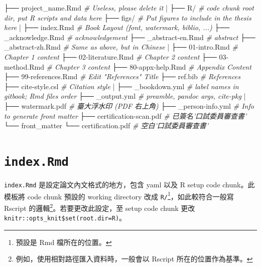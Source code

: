\documentclass[oneside]{book}
\newenvironment{Shaded}{\begin{snugshade}}{\end{snugshade}}
\newcommand{\CommentTok}[1]{\textcolor[rgb]{0.56,0.35,0.01}{\textit{#1}}}
\newcommand{\NormalTok}[1]{#1}
\theoremstyle{definition}
\theoremstyle{definition}
\theoremstyle{definition}
\theoremstyle{remark}
\begin{document}
\begin{Shaded}
\begin{Highlighting}[]
\NormalTok{├── project_name.Rmd     }\CommentTok{# Useless, please delete it}
\NormalTok{|}
\NormalTok{├── R/                   }\CommentTok{# code chunk root dir, put R scripts and data here}
\NormalTok{├── figs/                }\CommentTok{# Put figures to include in the thesis here}
\NormalTok{|}
\NormalTok{├── index.Rmd            }\CommentTok{# Book Layout (font, watermark, biblio, ...)}
\NormalTok{├── _acknowledge.Rmd     }\CommentTok{# acknowledgement}
\NormalTok{├── _abstract-en.Rmd     }\CommentTok{# abstract}
\NormalTok{├── _abstract-zh.Rmd     }\CommentTok{# Same as above, but in Chinese}
\NormalTok{|}
\NormalTok{├── 01-intro.Rmd         }\CommentTok{# Chapter 1 content}
\NormalTok{├── 02-literature.Rmd    }\CommentTok{# Chapter 2 content}
\NormalTok{├── 03-method.Rmd        }\CommentTok{# Chapter 3 content}
\NormalTok{├── 80-appx-help.Rmd     }\CommentTok{# Appendix Content}
\NormalTok{├── 99-references.Rmd    }\CommentTok{# Edit "References" Title}
\NormalTok{├── ref.bib              }\CommentTok{# References}
\NormalTok{├── cite-style.csl       }\CommentTok{# Citation style}
\NormalTok{|}
\NormalTok{├── _bookdown.yml        }\CommentTok{# label names in gitbook; Rmd files order}
\NormalTok{├── _output.yml          }\CommentTok{# preamble, pandoc args, cite-pkg}
\NormalTok{|}
\NormalTok{├── watermark.pdf        }\CommentTok{# 臺大浮水印 (PDF 右上角)}
\NormalTok{├── _person-info.yml      }\CommentTok{# Info to generate front matter}
\NormalTok{├── certification-scan.pdf  }\CommentTok{# 已簽名'口試委員審查書'}
\NormalTok{└── front_matter}
\NormalTok{    └── certification.pdf   }\CommentTok{# 空白'口試委員審查書'}
\end{Highlighting}
\end{Shaded}

\hypertarget{index-rmd}{%
\section{\texorpdfstring{\texttt{index.Rmd}}{index.Rmd}}\label{index-rmd}}

\texttt{index.Rmd} 是設定論文內文格式的地方，包含 yaml 以及 R setup code chunk。此模板將 code chunk 預設的 working directory 改成 \texttt{R/}\footnote{預設是 Rmd 檔所在的位置。}，如此較符合一般寫 Rscript 的邏輯\footnote{例如，使用相對路徑匯入資料時，一般會以 Rscript 所在的位置作為基準。}。若要更改此設定，至 setup code chunk 更改 \texttt{knitr::opts\_knit\$set(root.dir=\textquotesingle{}R\textquotesingle{})}。
\end{document}
